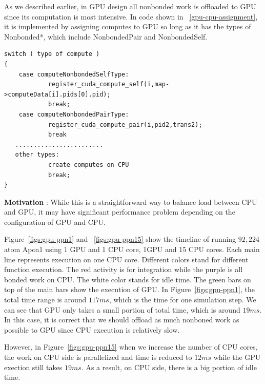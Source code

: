 As we described earlier, in \namd{} GPU design all nonbonded work 
is offloaded to GPU since its computation is most intensive.
In code shown in ~\ref{gpu-cpu-assignment}, it is implemented by assigning computes to GPU so long as 
it has the types of Nonbonded*, which include NonbondedPair and
NonbondedSelf.  

\begin{lstlisting}[frame=single,caption={Compute Assignment},label=gpu-cpu-assignment]
switch ( type of compute )    
{
    case computeNonbondedSelfType:
            register_cuda_compute_self(i,map->computeData[i].pids[0].pid);
            break;
    case computeNonbondedPairType:
            register_cuda_compute_pair(i,pid2,trans2);
            break
   ........................
   other types:
            create computes on CPU
            break;
}

\end{lstlisting}

\textbf{Motivation} : While this is a straightforward way to balance load between CPU and GPU, 
it may have significant performance problem depending on the configuration
of GPU and CPU.

Figure~\ref{figs:gpu-ppn1} and ~\ref{figs:gpu-ppn15} show the timeline of 
running $92,224$ atom Apoa1 using 1 GPU and 1 CPU core, 1GPU and 15 CPU cores.
Each main line represents execution on one CPU core. Different colors stand for 
different function execution. The red activity is for integration while the purple
is all bonded work on CPU. The white color stands for idle time. The green bars on top of the main bars 
show the execution of GPU. In Figure~\ref{figs:gpu-ppn1}, the total time range 
is around $117 ms$, which is the time for one simulation step. We can see that
GPU only takes a small portion of total time, which is around $19 ms$.
In this case, it is correct that we should offload as much nonboned work as possible
to GPU since CPU execution is relatively slow. 

However, in Figure~\ref{figs:gpu-ppn15} when we increase the number of CPU cores, 
the work on CPU side is parallelized and time is reduced to $12 ms $ while the GPU exection
still takes $19 ms$. As a result, on CPU side, there is a big portion of idle time.    

